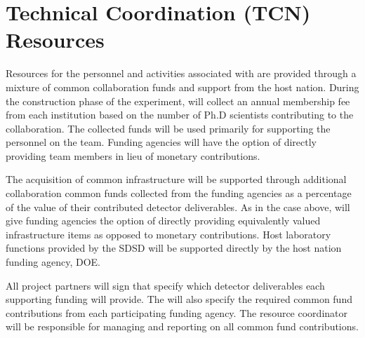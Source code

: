 \section{Technical Coordination (TCN) Resources}
\label{sec:tc_resources}

Resources for the personnel and activities associated with 
are provided through a mixture of common collaboration funds and
support from the host nation.  During the construction phase of the
experiment,  will collect an annual membership fee from
each institution based on the number of Ph.D scientists %
contributing to the
collaboration.  The collected funds will be used primarily for
supporting the personnel %
on the  team.  Funding
agencies will have the option of directly providing team members in
lieu of %
monetary contributions.

The acquisition of common infrastructure will be supported through
additional collaboration common funds collected from the funding
agencies as a percentage of the value of their contributed detector
deliverables.  As in the case above,  will give funding agencies %
the option of directly providing equivalently valued infrastructure
items as opposed to %
monetary contributions.  Host laboratory
functions provided by the SDSD will be supported directly by the host nation
funding agency, DOE.

All project partners will sign  that specify which detector
deliverables each %
supporting funding %
will provide. The  will also specify the required common fund
contributions from each  participating funding agency.  The
 resource coordinator will be responsible for managing and
reporting on all common fund contributions.
